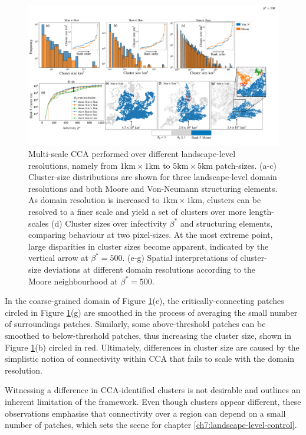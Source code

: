 \begin{landscape}
\begin{figure}
    \centering
    \includegraphics[scale=0.395]{chapter6/figures/fig6-ga-cluster-distribution.pdf} 
    \caption{Multi-scale CCA performed over different landscape-level resolutions, namely from $\mathrm{1km \times 1km}$ to $\mathrm{5km \times 5km}$ patch-sizes. (a-c) Cluster-size distributions are shown for three landscape-level domain resolutions and both Moore and Von-Neumann structuring elements. As domain resolution is increased to $\mathrm{1km \times 1km}$, clusters can be resolved to a finer scale and yield a set of clusters over more length-scales (d) Cluster sizes over infectivity $\beta^*$ and structuring elements, comparing behaviour at two pixel-sizes. At the most extreme point, large disparities in cluster sizes become apparent, indicated by the vertical arrow at $\beta^*=500$. (e-g) Spatial interpretations of cluster-size deviations at different domain resolutions according to the Moore neighbourhood at $\beta^*=500$.}
    \label{fig:gaussian-clustering}
\end{figure}
\end{landscape}

In the coarse-grained domain of Figure \ref{fig:gaussian-clustering}(e), the critically-connecting patches circled in Figure \ref{fig:gaussian-clustering}(g) 
are smoothed in the process of averaging the small number of surroundings patches. 
Similarly, some above-threshold patches can be smoothed to below-threshold patches, thus increasing the cluster size, shown in Figure \ref{fig:gaussian-clustering}(b) circled in red.
Ultimately, differences in cluster size are caused by the simplistic notion of connectivity within CCA that fails to scale with the domain resolution.

Witnessing a difference in CCA-identified clusters is not desirable and outlines an inherent limitation of the framework.
Even though clusters appear different, these observations emphasise that connectivity over a region can depend on a small number of patches, 
which sets the scene for chapter \ref{ch7:landscape-level-control}.


